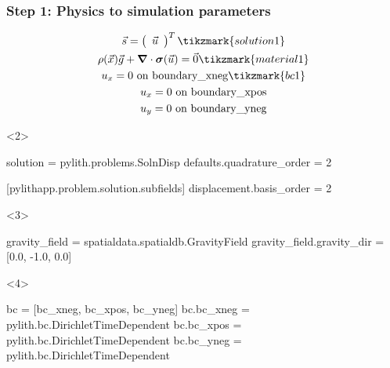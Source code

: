 \documentclass[aspectratio=169]{beamer}
\begin{document}
\begin{frame}[t,fragile]
  \frametitle{Step 1: Physics to simulation parameters}
  \summary{}

  \begin{minipage}[t]{0.3\textwidth}
    {\scriptsize
    \begin{gather*}
    \vec{s} = \left(\begin{array}{c} \vec{u} \end{array}\right)^T \tikzmark{solution1}\\
    \rho(\vec{x}) \vec{g} + \tensor{\nabla} \cdot \tensor{\sigma}(\vec{u}) = \vec{0} \tikzmark{material1}\\
    u_x = 0 \text{ on boundary\_xneg} \tikzmark{bc1}\\
    u_x = 0 \text{ on boundary\_xpos} \\
    u_y = 0 \text{ on boundary\_yneg} \\
    \end{gather*}}
  \end{minipage}
  \hfill
  \begin{minipage}[t]{0.67\textwidth}
    \begin{onlyenv}<2>
      \begin{cfgcode}
        solution = pylith.problems.SolnDisp
        defaults.quadrature_order = 2
        
        [pylithapp.problem.solution.subfields]
        displacement.basis_order = 2
      \end{cfgcode}
    \end{onlyenv}
    \begin{onlyenv}<3>
      \begin{cfgcode}
        gravity_field = spatialdata.spatialdb.GravityField
        gravity_field.gravity_dir = [0.0, -1.0, 0.0]
      \end{cfgcode}
    \end{onlyenv}
    \begin{onlyenv}<4>
      \begin{cfgcode}
        bc = [bc_xneg, bc_xpos, bc_yneg]
        bc.bc_xneg = pylith.bc.DirichletTimeDependent
        bc.bc_xpos = pylith.bc.DirichletTimeDependent
        bc.bc_yneg = pylith.bc.DirichletTimeDependent
        

\end{cfgcode}
\end{onlyenv}
\end{minipage}
\end{frame}
\end{document}
